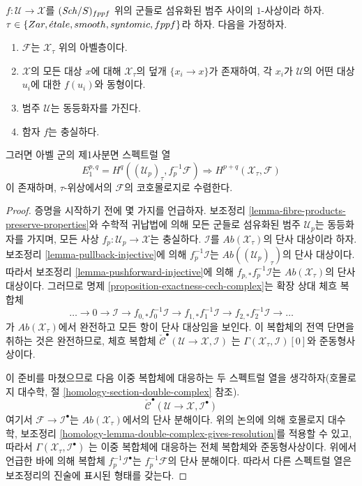 \begin{lemma}
\label{lemma-cech-to-cohomology}
$f : \mathcal{U} \to \mathcal{X}$를 $(\mathit{Sch}/S)_{fppf}$ 위의
군들로 섬유화된 범주 사이의 $1$-사상이라 하자.
$\tau \in \{Zar, {\acute{e}tale}, smooth, syntomic, fppf\}$라 하자.
다음을 가정하자.
\begin{enumerate}
\item $\mathcal{F}$는 $\mathcal{X}_\tau$ 위의 아벨층이다.
\item $\mathcal{X}$의 모든 대상 $x$에 대해
$\mathcal{X}_\tau$의 덮개 $\{x_i \to x\}$가 존재하여,
각 $x_i$가 $\mathcal{U}$의 어떤 대상 $u_i$에 대한
$f(u_i)$와 동형이다.
\item 범주 $\mathcal{U}$는 동등화자를 가진다.
\item 함자 $f$는 충실하다.
\end{enumerate}
그러면 아벨 군의 제1사분면 스펙트럴 열
$$
E_1^{p, q} = H^q((\mathcal{U}_p)_\tau, f_p^{-1}\mathcal{F})
\Rightarrow
H^{p + q}(\mathcal{X}_\tau, \mathcal{F})
$$
이 존재하며, $\tau$-위상에서의 $\mathcal{F}$의 코호몰로지로
수렴한다.
\end{lemma}

\begin{proof}
증명을 시작하기 전에 몇 가지를 언급하자.
보조정리 \ref{lemma-fibre-products-preserve-properties}와
수학적 귀납법에 의해 모든 군들로 섬유화된 범주
$\mathcal{U}_p$는 동등화자를 가지며, 모든 사상
$f_p : \mathcal{U}_p \to \mathcal{X}$는 충실하다.
$\mathcal{I}$를 $\textit{Ab}(\mathcal{X}_\tau)$의 단사 대상이라 하자.
보조정리 \ref{lemma-pullback-injective}에 의해
$f_p^{-1}\mathcal{I}$는
$\textit{Ab}((\mathcal{U}_p)_\tau)$의 단사 대상이다.
따라서 보조정리 \ref{lemma-pushforward-injective}에 의해
$f_{p, *}f_p^{-1}\mathcal{I}$는
$\textit{Ab}(\mathcal{X}_\tau)$의 단사 대상이다.
그러므로 명제 \ref{proposition-exactness-cech-complex}는
확장 상대 체흐 복합체
$$
\ldots \to 0 \to
\mathcal{I} \to
f_{0, *}f_0^{-1}\mathcal{I} \to
f_{1, *}f_1^{-1}\mathcal{I} \to
f_{2, *}f_2^{-1}\mathcal{I} \to \ldots
$$
가 $\textit{Ab}(\mathcal{X}_\tau)$에서 완전하고 모든 항이
단사 대상임을 보인다. 이 복합체의 전역 단면을 취하는 것은
완전하므로, 체흐 복합체
$\check{\mathcal{C}}^\bullet(\mathcal{U} \to \mathcal{X}, \mathcal{I})$
는 $\Gamma(\mathcal{X}_\tau, \mathcal{I})[0]$와 준동형사상이다.

\medskip\noindent
이 준비를 마쳤으므로 다음 이중 복합체에 대응하는 두 스펙트럴 열을
생각하자(호몰로지 대수학, 절 \ref{homology-section-double-complex} 참조).
$$
\check{\mathcal{C}}^\bullet(\mathcal{U} \to \mathcal{X}, \mathcal{I}^\bullet)
$$
여기서 $\mathcal{F} \to \mathcal{I}^\bullet$는
$\textit{Ab}(\mathcal{X}_\tau)$에서의 단사 분해이다.
위의 논의에 의해 호몰로지 대수학, 보조정리
\ref{homology-lemma-double-complex-gives-resolution}를 적용할 수 있고,
따라서
$\Gamma(\mathcal{X}_\tau, \mathcal{I}^\bullet)$
는 이중 복합체에 대응하는 전체 복합체와 준동형사상이다.
위에서 언급한 바에 의해 복합체 $f_p^{-1}\mathcal{I}^\bullet$는
$f_p^{-1}\mathcal{F}$의 단사 분해이다. 따라서 다른 스펙트럴 열은
보조정리의 진술에 표시된 형태를 갖는다.
\end{proof}

